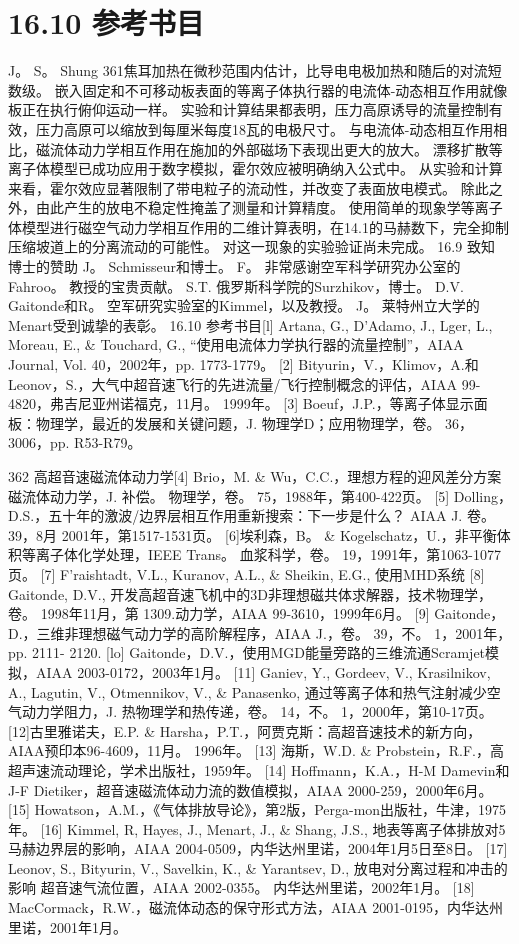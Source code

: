 \documentclass[UTF8,11pt,a4paper,openany,fontset=fandol]{ctexbook}
\begin{document}
\section{16.10 参考书目}
J。 S。 Shung 361焦耳加热在微秒范围内估计，比导电电极加热和随后的对流短数级。 嵌入固定和不可移动板表面的等离子体执行器的电流体-动态相互作用就像板正在执行俯仰运动一样。 实验和计算结果都表明，压力高原诱导的流量控制有效，压力高原可以缩放到每厘米每度18瓦的电极尺寸。 与电流体-动态相互作用相比，磁流体动力学相互作用在施加的外部磁场下表现出更大的放大。 漂移扩散等离子体模型已成功应用于数字模拟，霍尔效应被明确纳入公式中。 从实验和计算来看，霍尔效应显著限制了带电粒子的流动性，并改变了表面放电模式。 除此之外，由此产生的放电不稳定性掩盖了测量和计算精度。 使用简单的现象学等离子体模型进行磁空气动力学相互作用的二维计算表明，在14.1的马赫数下，完全抑制压缩坡道上的分离流动的可能性。 对这一现象的实验验证尚未完成。 16.9 致知 博士的赞助 J。 Schmisseur和博士。 F。 非常感谢空军科学研究办公室的Fahroo。 教授的宝贵贡献。 S.T. 俄罗斯科学院的Surzhikov，博士。 D.V. Gaitonde和R。 空军研究实验室的Kimmel，以及教授。 J。 莱特州立大学的Menart受到诚挚的表彰。 16.10 参考书目[l] Artana, G., D'Adamo, J., Lger, L., Moreau, E., \& Touchard, G., “使用电流体力学执行器的流量控制”，AIAA Journal, Vol. 40，2002年，pp. 1773-1779。 [2] Bityurin，V.，Klimov，A.和Leonov，S.，大气中超音速飞行的先进流量/飞行控制概念的评估，AIAA 99-4820，弗吉尼亚州诺福克，11月。 1999年。 [3] Boeuf，J.P.，等离子体显示面板：物理学，最近的发展和关键问题，J. 物理学D；应用物理学，卷。 36，3006，pp. R53-R79。

362 高超音速磁流体动力学[4] Brio，M. \& Wu，C.C.，理想方程的迎风差分方案磁流体动力学，J. 补偿。 物理学，卷。 75，1988年，第400-422页。 [5] Dolling，D.S.，五十年的激波/边界层相互作用重新搜索：下一步是什么？ AIAA J. 卷。 39，8月 2001年，第1517-1531页。 [6]埃利森，B。 \& Kogelschatz，U.，非平衡体积等离子体化学处理，IEEE Trans。 血浆科学，卷。 19，1991年，第1063-1077页。 [7] F'raishtadt, V.L., Kuranov, A.L., \& Sheikin, E.G., 使用MHD系统 [8] Gaitonde, D.V., 开发高超音速飞机中的3D非理想磁共体求解器，技术物理学，卷。 1998年11月，第 1309.动力学，AIAA 99-3610，1999年6月。 [9] Gaitonde，D.，三维非理想磁气动力学的高阶解程序，AIAA J.，卷。 39，不。 1，2001年，pp. 2111- 2120. [lo] Gaitonde，D.V.，使用MGD能量旁路的三维流通Scramjet模拟，AIAA 2003-0172，2003年1月。 [11] Ganiev, Y., Gordeev, V., Krasilnikov, A., Lagutin, V., Otmennikov, V., \& Panasenko, 通过等离子体和热气注射减少空气动力学阻力，J. 热物理学和热传递，卷。 14，不。 1，2000年，第10-17页。 [12]古里雅诺夫，E.P. \& Harsha，P.T.，阿贾克斯：高超音速技术的新方向，AIAA预印本96-4609，11月。 1996年。 [13] 海斯，W.D. \& Probstein，R.F.，高超声速流动理论，学术出版社，1959年。 [14] Hoffmann，K.A.，H-M Damevin和J-F Dietiker，超音速磁流体动力流的数值模拟，AIAA 2000-259，2000年6月。 [15] Howatson，A.M.，《气体排放导论》，第2版，Perga-mon出版社，牛津，1975年。 [16] Kimmel, R, Hayes, J., Menart, J., \& Shang, J.S., 地表等离子体排放对5马赫边界层的影响，AIAA 2004-0509，内华达州里诺，2004年1月5日至8日。 [17] Leonov, S., Bityurin, V., Savelkin, K., \& Yarantsev, D., 放电对分离过程和冲击的影响 超音速气流位置，AIAA 2002-0355。 内华达州里诺，2002年1月。 [18] MacCormack，R.W.，磁流体动态的保守形式方法，AIAA 2001-0195，内华达州里诺，2001年1月。
\end{document}
